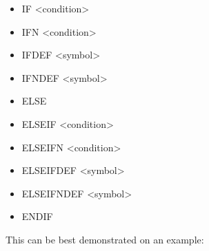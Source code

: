     \begin{itemize}
        \item IF <condition>
        \item IFN <condition>
        \item IFDEF <symbol>
        \item IFNDEF <symbol>
        \item ELSE
        \item ELSEIF <condition>
        \item ELSEIFN <condition>
        \item ELSEIFDEF <symbol>
        \item ELSEIFNDEF <symbol>
        \item ENDIF
    \end{itemize}

    This can be best demonstrated on an example:
